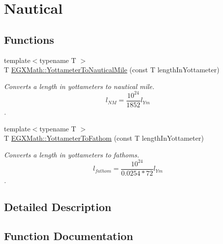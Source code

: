 \hypertarget{group___e_g_x_math-_conversions-_length_conversions-_s_i-_yottameter-_nautical}{}\section{Nautical}
\label{group___e_g_x_math-_conversions-_length_conversions-_s_i-_yottameter-_nautical}
\subsection*{Functions}
\begin{DoxyCompactItemize}
\item 
{\footnotesize template$<$typename T $>$ }\\T \mbox{\hyperlink{group___e_g_x_math-_conversions-_length_conversions-_s_i-_yottameter-_nautical_ga455b7f16dd9ff68f759f366def111300}{E\+G\+X\+Math\+::\+Yottameter\+To\+Nautical\+Mile}} (const T length\+In\+Yottameter)
\begin{DoxyCompactList}\small\item\em Converts a length in yottameters to nautical mile. \[ l_{NM}= \frac{10^{24}}{1852} l_{Ym} \]. \end{DoxyCompactList}\item 
{\footnotesize template$<$typename T $>$ }\\T \mbox{\hyperlink{group___e_g_x_math-_conversions-_length_conversions-_s_i-_yottameter-_nautical_ga602afc490045a91db8931798e6ee4bbd}{E\+G\+X\+Math\+::\+Yottameter\+To\+Fathom}} (const T length\+In\+Yottameter)
\begin{DoxyCompactList}\small\item\em Converts a length in yottameters to fathoms. \[ l_{fathom}= \frac{10^{24}}{0.0254 * 72} l_{Ym} \]. \end{DoxyCompactList}\end{DoxyCompactItemize}


\subsection{Detailed Description}


\subsection{Function Documentation}
\mbox{\label{group___e_g_x_math-_conversions-_length_conversions-_s_i-_yottameter-_nautical_ga602afc490045a91db8931798e6ee4bbd}} 
